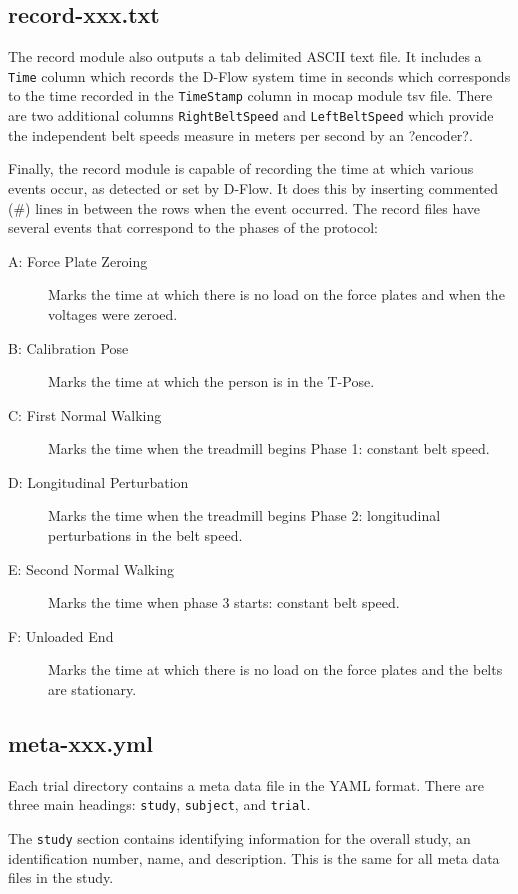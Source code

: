 \documentclass{article}
\begin{document}
\subsection{record-xxx.txt}
%
The record module also outputs a tab delimited ASCII text file. It includes a
\verb+Time+ column which records the D-Flow system time in seconds which
corresponds to the time recorded in the \verb+TimeStamp+ column in mocap module
tsv file. There are two additional columns \verb+RightBeltSpeed+ and
\verb+LeftBeltSpeed+ which provide the independent belt speeds measure in
meters per second by an ?encoder?.

Finally, the record module is capable of recording the time at which various
events occur, as detected or set by D-Flow. It does this by inserting commented
(\#) lines in between the rows when the event occurred. The record files have
several events that correspond to the phases of the protocol:

\begin{description}
  \item[A: Force Plate Zeroing] Marks the time at which there is no load on the
    force plates and when the voltages were zeroed.
  \item[B: Calibration Pose] Marks the time at which the person is in the
    T-Pose.
  \item[C: First Normal Walking] Marks the time when the treadmill begins Phase
    1: constant belt speed.
  \item[D: Longitudinal Perturbation] Marks the time when the treadmill begins
    Phase 2: longitudinal perturbations in the belt speed.
  \item[E: Second Normal Walking] Marks the time when phase 3 starts: constant
    belt speed.
  \item[F: Unloaded End] Marks the time at which there is no load on the force
    plates and the belts are stationary.
\end{description}

\subsection{meta-xxx.yml}

Each trial directory contains a meta data file in the YAML format. There are
three main headings: \verb+study+, \verb+subject+, and \verb+trial+.

The \verb+study+ section contains identifying information for the overall
study, an identification number, name, and description. This is the same for
all meta data files in the study.
\end{document}
